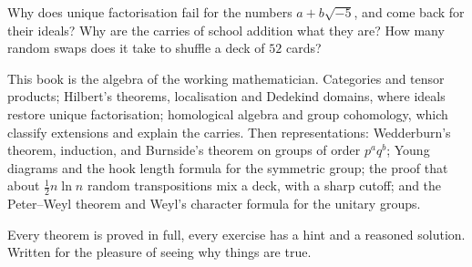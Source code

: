 Why does unique factorisation fail for the numbers $a+b\sqrt{-5}$, and come back for their ideals? Why are the carries of school
addition what they are? How many random swaps does it take to shuffle a deck of $52$ cards?

This book is the algebra of the working mathematician. Categories and tensor products; Hilbert's theorems, localisation and
Dedekind domains, where ideals restore unique factorisation; homological algebra and group cohomology, which classify extensions and
explain the carries. Then representations: Wedderburn's theorem, induction, and Burnside's theorem on groups of order $p^aq^b$;
Young diagrams and the hook length formula for the symmetric group; the proof that about $\frac12n\ln n$ random transpositions mix
a deck, with a sharp cutoff; and the Peter--Weyl theorem and Weyl's character formula for the unitary groups.

Every theorem is proved in full, every exercise has a hint and a reasoned solution. Written for the pleasure of seeing why things are true.
